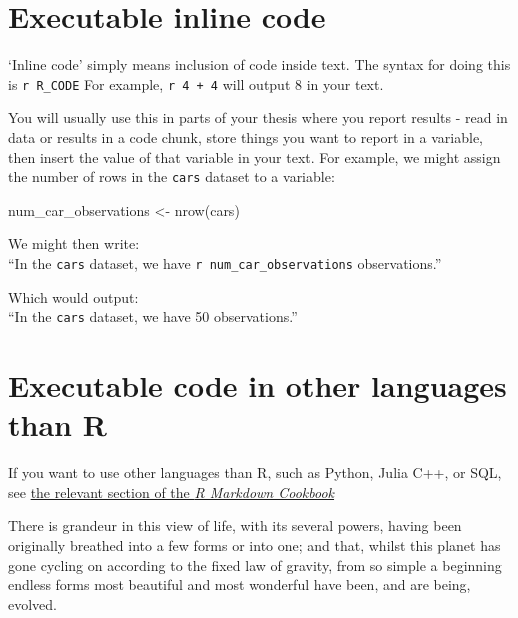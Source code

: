 \documentclass[a4paper, nobind]{templates/ociamthesis}
\newenvironment{Shaded}{\begin{snugshade}}{\end{snugshade}}
\newcommand{\FunctionTok}[1]{\textcolor[rgb]{0.00,0.00,0.00}{#1}}
\newcommand{\NormalTok}[1]{#1}
\newcommand{\OtherTok}[1]{\textcolor[rgb]{0.56,0.35,0.01}{#1}}
\renewenvironment{Shaded}
{
  \vspace{10pt}%
  \begin{snugshade}%
}{%
  \end{snugshade}%
  \vspace{8pt}%
}
\begin{document}
\hypertarget{executable-inline-code}{%
\section{Executable inline code}\label{executable-inline-code}}

`Inline code' simply means inclusion of code inside text.
The syntax for doing this is \texttt{\textasciigrave{}r\ R\_CODE\textasciigrave{}}
For example, \texttt{\textasciigrave{}r\ 4\ +\ 4\textasciigrave{}} will output 8 in your text.

You will usually use this in parts of your thesis where you report results - read in data or results in a code chunk, store things you want to report in a variable, then insert the value of that variable in your text.
For example, we might assign the number of rows in the \texttt{cars} dataset to a variable:

\begin{Shaded}
\begin{Highlighting}[]
\NormalTok{num\_car\_observations }\OtherTok{\textless{}{-}} \FunctionTok{nrow}\NormalTok{(cars)}
\end{Highlighting}
\end{Shaded}

We might then write:\\
``In the \texttt{cars} dataset, we have \texttt{\textasciigrave{}r\ num\_car\_observations\textasciigrave{}} observations.''

Which would output:\\
``In the \texttt{cars} dataset, we have 50 observations.''

\hypertarget{executable-code-in-other-languages-than-r}{%
\section{Executable code in other languages than R}\label{executable-code-in-other-languages-than-r}}

If you want to use other languages than R, such as Python, Julia C++, or SQL, see \href{https://bookdown.org/yihui/rmarkdown-cookbook/other-languages.html}{the relevant section of the \emph{R Markdown Cookbook}}

\begin{savequote}
There is grandeur in this view of life, with its several powers, having
been originally breathed into a few forms or into one; and that, whilst
this planet has gone cycling on according to the fixed law of gravity,
from so simple a beginning endless forms most beautiful and most
wonderful have been, and are being, evolved.
\end{savequote}
\end{document}
